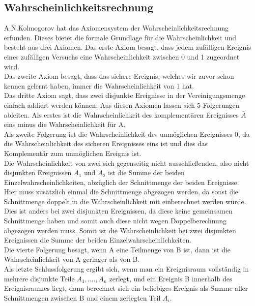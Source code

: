 \documentclass[a4paper]{article}
\newcommand\dangersign[1][2ex]{%
  \renewcommand\stacktype{L}%
  \scaleto{\stackon[1.3pt]{\color{red}$\triangle$}{\tiny !}}{#1}%
}
\begin{document}
\subsection{Wahrscheinlichkeitsrechnung} \label{sec:W'keitsrechnung}
A.N.Kolmogorov hat das Axiomensystem der Wahrscheinlichkeitsrechnung erfunden. Dieses bietet die formale Grundlage für die Wahrscheinlichkeit und besteht aus drei Axiomen.
Das erste Axiom besagt, dass jedem zufälligen Ereignis eines zufälligen Versuchs eine Wahrscheinlichkeit zwischen 0 und 1 zugeordnet wird.\\
Das zweite Axiom besagt, dass das sichere Ereignis, welches wir zuvor schon kennen gelernt haben, immer die Wahrscheinlichkeit von 1 hat.\\
Das dritte Axiom sagt, dass zwei disjunkte Ereignisse in der Vereinigungsmenge einfach addiert werden können.
Aus diesen Axiomen lassen sich 5 Folgerungen ableiten. Als erstes ist die Wahrscheinlichkeit des komplementären Ereignisses $\bar A$ eins minus die Wahrscheinlichkeit für A.\\
Als zweite Folgerung ist die Wahrscheinlichkeit des unmöglichen Ereignisses 0, da die Wahrscheinlichkeit des sicheren Ereignisses eins ist und dies das Komplementär zum unmöglichen Ereignis ist.\\
Die Wahrscheinlichkeit von zwei sich gegenseitig nicht ausschließenden, also nicht disjunkten Ereignissen $A_1$ und $A_2$ ist die Summe der beiden Einzelwahrscheinlichkeiten, abzüglich der Schnittmenge der beiden Ereignisse. 
\dangersign Hier muss zusätzlich einmal die Schnittmenge abgezogen werden, da sonst die Schnittmenge doppelt in die Wahrscheinlichkeit mit einberechnet werden würde. Dies ist anders bei zwei disjunkten Ereignissen, da diese keine gemeinsamen Schnittmenge haben und somit auch diese nicht wegen Doppelberechnung abgezogen werden muss. Somit ist die Wahrscheinlichkeit bei zwei disjunkten Ereignissen die Summe der beiden Einzelwahrscheinlichkeiten.\\
Die vierte Folgerung besagt, wenn A eine Teilmenge von B ist, dann ist die Wahrscheinlichkeit von A geringer als von B. \\
Als letzte Schlussfolgerung ergibt sich, wenn man ein Ereignisraum vollständig in mehrere disjunkte Teile $A_1,....,A_n$ zerlegt, und ein Ereignis B innerhalb des Ereignisraumes liegt, dann berechnet sich ein beliebiges Ereignis als Summe aller Schnittmengen zwischen B und einem zerlegten Teil $A_i$.
\end{document}
